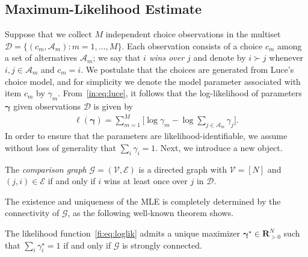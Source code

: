 \subsection{Maximum-Likelihood Estimate}


Suppose that we collect $M$ independent choice observations in the multiset $\mathcal{D} = \{(c_m, \mathcal{A}_m) : m = 1, \ldots, M\}$.
Each observation consists of a choice $c_m$ among a set of alternatives $\mathcal{A}_m$;
we say that \emph{$i$ wins over $j$} and denote by $i \succ j$ whenever $i, j \in \mathcal{A}_m$ and $c_m = i$.
We postulate that the choices are generated from Luce's choice model, and for simplicity we denote the model parameter associated with item $c_m$ by $\gamma_m$.
From~\eqref{in:eq:luce}, it follows that the log-likelihood of parameters $\bm{\gamma}$ given observations $\mathcal{D}$ is given by
\begin{align}
\label{fi:eq:loglik}
\ell(\bm{\gamma}) = \sum_{m = 1}^M \bigg[ \log \gamma_m - \log{\sum_{j \in \mathcal{A}_m} \gamma_j} \bigg].
\end{align}
In order to ensure that the parameters are likelihood-identifiable, we assume without loss of generality that $\sum_i \gamma_i = 1$.
Next, we introduce a new object.

\begin{definition}
The \emph{comparison graph} $\mathcal{G} = (\mathcal{V}, \mathcal{E})$ is a directed graph with $\mathcal{V} = [N]$ and $(j, i) \in \mathcal{E}$ if and only if $i$ wins at least once over $j$ in $\mathcal{D}$.
\end{definition}

The existence and uniqueness of the MLE is completely determined by the connectivity of $\mathcal{G}$, as the following well-known theorem shows.

\begin{theorem}
\label{fi:thm:mlboth}
The likelihood function~\eqref{fi:eq:loglik} admits a unique maximizer $\bm{\gamma}^\star \in \mathbf{R}^N_{>0}$ such that $\sum_i \gamma^\star_i = 1$ if and only if $\mathcal{G}$ is strongly connected.
\end{theorem}


